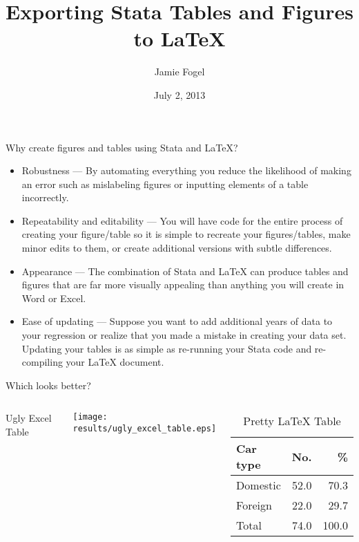\documentclass[fleqn, table, 10pt]{beamer}
\title[Exporting Stata Tables and Figures to \LaTeX{}]{\textbf{Exporting Stata Tables and Figures to \LaTeX{}}}
\date[July 2, 2013]{July 2, 2013}
\author[J. Fogel]{Jamie Fogel}
\def\results{S:/trainings/exporting_stata_tables_figures/results}
\begin{document}
\begin{frame}[plain]
    \titlepage
\end{frame}

\begin{frame}{Why create figures and tables using Stata and \LaTeX{}?}
    \begin{itemize}
        \item Robustness --- By automating everything you reduce the likelihood of making an error such as mislabeling figures or inputting elements of a table incorrectly.
        \item Repeatability and editability --- You will have code for the entire process of creating your figure/table so it is simple to recreate your figures/tables, make minor edits to them, or create additional versions with subtle differences.
        \item Appearance --- The combination of Stata and \LaTeX{} can produce tables and figures that are far more visually appealing than anything you will create in Word or Excel.
        \item Ease of updating --- Suppose you want to add additional years of data to your regression or realize that you made a mistake in creating your data set. Updating your tables is as simple as re-running your Stata code and re-compiling your \LaTeX{} document.
    \end{itemize}
\end{frame}

\begin{frame}{Which looks better?}
    \begin{columns}[T]
            \begin{table}
                \caption{Ugly Excel Table}
                \texttt{[image: \\results/ugly\_excel\_table.eps]}
            \end{table}
            \begin{table}
            \caption{Pretty \LaTeX{} Table}
            \label{mytablelabel}
            \begin{tabular}{lrr}
                Car type&No.&\% \\
                \midrule
                Domestic&52.0&70.3 \\
                Foreign&22.0&29.7 \\
                Total&74.0&100.0 \\
            \end{tabular}
            \end{table}
    \end{columns}
\end{frame}
\end{document}
